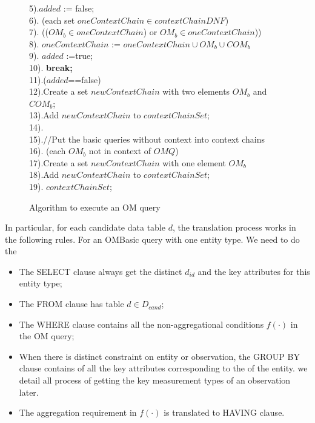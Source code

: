 \begin{figure}[htb]
\begin{scriptsize}
\begin{tabbing}
5).\>\>$added$ := false;\\
6).\> (each set $oneContextChain \in contextChainDNF$)\\
7).\>\> (($OM_{b} \in oneContextChain$) or $OM_{b} \in oneContextChain$))\\
8).\>\>\>\> $oneContextChain$ := $oneContextChain \cup OM_{b} \cup COM_{b}$\\
9).\>\>\>\> $added$ :=true;\\
10).\>\>\>\> {\bf break;}\\
11).\>($added$==false)\\
12).\>\>\>Create a set $newContextChain$ with two elements $OM_{b}$ and $COM_{b}$;\\
13).\>\>\>Add $newContextChain$ to $contextChainSet$;\\
14).\\
15).\>//Put the basic queries without context into context chains\\
16). (each $OM_{b}$ not in context of $OMQ$)\\
17).\>\>Create a set $newContextChain$ with one element $OM_{b}$\\
18).\>\>Add $newContextChain$ to $contextChainSet$;\\
19). $contextChainSet$;
\end{tabbing}
\end{scriptsize}
\caption{Algorithm to execute an OM query}
\label{alg:omq}
\end{figure}

In particular, for each candidate data table $d$,
the translation process works in the following rules.
For an OMBasic query with one entity type.
We need to do the

\begin{itemize}
\item The SELECT clause always get the distinct $d_{id}$ and the key attributes for this entity type;
\item The FROM clause has table $d \in D_{cand}$;
\item The WHERE clause contains all the non-aggregational conditions $f(\cdot)$ in the OM
  query;
\item When there is distinct constraint on entity or observation, the
  GROUP BY clause contains of all the key attributes corresponding to the of the entity. we detail
  all process of getting the key measurement types of an observation
  later.
\item The aggregation requirement in $f(\cdot)$ is translated to
  HAVING clause.
\end{itemize}

